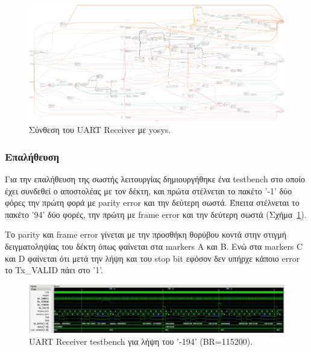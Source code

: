 \documentclass[../main.tex]{subfiles}
\begin{document}
\begin{figure}[H]
  \begin{center}
    \includegraphics[width=\textwidth]{../../diagrams/UartReceiver.png}
  \end{center}
  \caption{Σύνθεση του UART Receiver με yosys.}
\end{figure}

\subsubsection*{Επαλήθευση}

Για την επαλήθευση της σωστής λειτουργίας δημιουργήθηκε ένα testbench στο οποίο
έχει συνδεθεί ο αποστολέας με τον δέκτη, και πρώτα στέλνεται το πακέτο '-1' δύο
φόρες την πρώτη φορά με parity error και την δεύτερη σωστά. Έπειτα στέλνεται το
πακέτο '94' δύο φορές, την πρώτη με frame error και την δεύτερη σωστά
(Σχήμα~\ref{fig:receiver_tb_zoomed_out}).

Το parity και frame error γίνεται με την προσθήκη θορύβου κοντά στην στιγμή
δειγματοληψίας του δέκτη όπως φαίνεται στα markers A και B. Ενώ στα markers C
και D φαίνεται ότι μετά την λήψη και του stop bit εφόσον δεν υπήρχε κάποιο error
το Tx\_VALID πάει στο '1'.

\begin{figure}[H]
  \begin{center}
    \includegraphics[width=\textwidth]{../images/receiver_tb_zoomed_out.png}
  \end{center}
  \caption{UART Receiver testbench για λήψη του '-194' (BR=115200).}
  \label{fig:receiver_tb_zoomed_out}
\end{figure}
\end{document}
